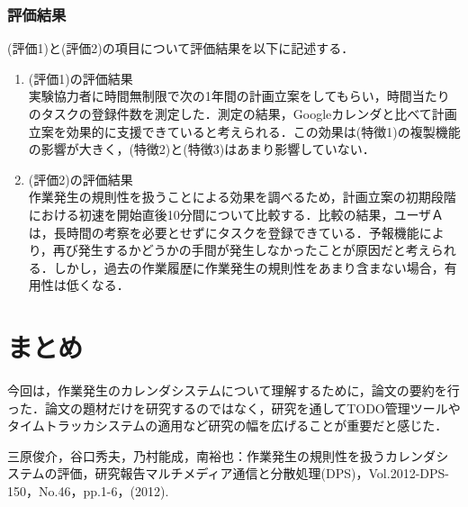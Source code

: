 \documentclass[fleqn, 14pt]{extarticlej}
\begin{document}
\subsubsection{評価結果}
(評価1)と(評価2)の項目について評価結果を以下に記述する．
	\begin{enumerate}
		\item (評価1)の評価結果\\
実験協力者に時間無制限で次の1年間の計画立案をしてもらい，時間当たりのタスクの登録件数を測定した．測定の結果，Googleカレンダと比べて計画立案を効果的に支援できていると考えられる．この効果は(特徴1)の複製機能の影響が大きく，(特徴2)と(特徴3)はあまり影響していない．
		\item (評価2)の評価結果\\
作業発生の規則性を扱うことによる効果を調べるため，計画立案の初期段階における初速を開始直後10分間について比較する．比較の結果，ユーザＡは，長時間の考察を必要とせずにタスクを登録できている．予報機能により，再び発生するかどうかの手間が発生しなかったことが原因だと考えられる．しかし，過去の作業履歴に作業発生の規則性をあまり含まない場合，有用性は低くなる．
	\end{enumerate}
			
\section{まとめ}
今回は，作業発生のカレンダシステムについて理解するために，論文の要約を行った．論文の題材だけを研究するのではなく，研究を通してTODO管理ツールやタイムトラッカシステムの適用など研究の幅を広げることが重要だと感じた．


\begin{thebibliography}{99}
   三原俊介，谷口秀夫，乃村能成，南裕也：作業発生の規則性を扱うカレンダシステムの評価，研究報告マルチメディア通信と分散処理(DPS)，Vol.2012-DPS-150，No.46，pp.1-6，(2012).\\
\end{thebibliography}
\end{document}
